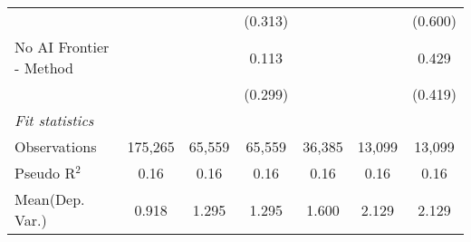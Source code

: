 \begin{tabular}{lcccccc}
                           &         &         & (0.313) &         &         & (0.600)\\   
   No AI Frontier - Method &         &         & 0.113   &         &         & 0.429\\   
                           &         &         & (0.299) &         &         & (0.419)\\   
   \midrule
   \emph{Fit statistics}\\
   Observations            & 175,265 & 65,559  & 65,559  & 36,385  & 13,099  & 13,099\\  
   Pseudo R$^2$            & 0.16    & 0.16    & 0.16    & 0.16    & 0.16    & 0.16\\  
Mean(Dep. Var.) & 0.918 & 1.295 & 1.295 & 1.600 & 2.129 & 2.129 \\
   

\end{tabular}
